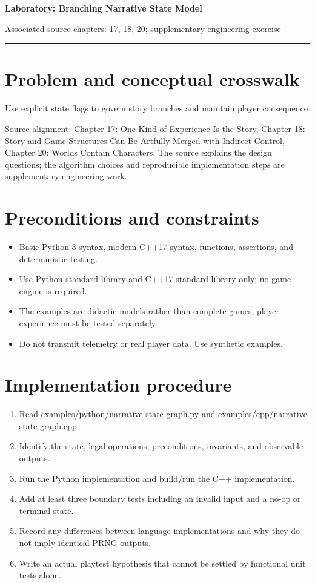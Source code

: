 \documentclass[11pt]{article}
\begin{document}
{\huge\bfseries\color{suiteblue} Laboratory: Branching Narrative State Model}\par
\vspace{0.15in}
{\normalsize\color{suitegray} Associated source chapters: 17, 18, 20; supplementary engineering exercise}\par
\vspace{0.15in}\hrule\vspace{0.15in}

\section{Problem and conceptual crosswalk}
Use explicit state flags to govern story branches and maintain player consequence.

Source alignment: Chapter 17: One Kind of Experience Is the Story, Chapter 18: Story and Game Structures Can Be Artfully Merged with Indirect Control, Chapter 20: Worlds Contain Characters. The source explains the design questions; the algorithm choices and reproducible implementation steps are supplementary engineering work.


\section{Preconditions and constraints}
\begin{itemize}
\item Basic Python 3 syntax, modern C++17 syntax, functions, assertions, and deterministic testing.
\item Use Python standard library and C++17 standard library only; no game engine is required.
\item The examples are didactic models rather than complete games; player experience must be tested separately.
\item Do not transmit telemetry or real player data. Use synthetic examples.
\end{itemize}

\section{Implementation procedure}
\begin{enumerate}
\item Read examples/python/narrative-state-graph.py and examples/cpp/narrative-state-graph.cpp.
\item Identify the state, legal operations, preconditions, invariants, and observable outputs.
\item Run the Python implementation and build/run the C++ implementation.
\item Add at least three boundary tests including an invalid input and a no-op or terminal state.
\item Record any differences between language implementations and why they do not imply identical PRNG outputs.
\item Write an actual playtest hypothesis that cannot be settled by functional unit tests alone.
\end{enumerate}
\end{document}
